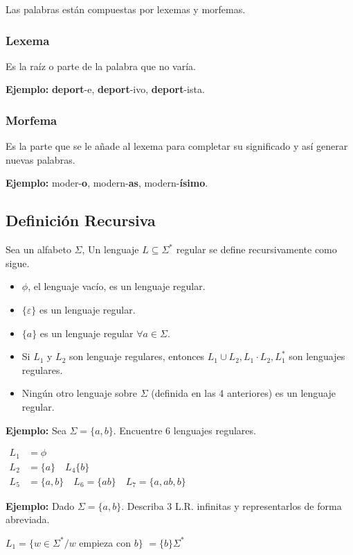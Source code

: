 Las palabras están compuestas por lexemas y morfemas.

\subsubsection{Lexema}
Es la raíz o parte de la palabra que no varía.

\textbf{Ejemplo: }\textbf{deport}-e, \textbf{deport}-ivo, \textbf{deport}-ista.
\subsubsection{Morfema}
Es la parte que se le añade al lexema para completar su significado y así generar nuevas palabras.

\textbf{Ejemplo: }moder-\textbf{o}, modern-\textbf{as}, modern-\textbf{ísimo}.

\subsection{Definición Recursiva}

Sea un alfabeto $\Sigma$, Un lenguaje $L\subseteq \Sigma^*$ regular se define recursivamente como sigue.
\begin{itemize}
\item $\phi$, el lenguaje vacío, es un lenguaje regular.
\item $\{ \varepsilon \}$ es un lenguaje regular.
\item $\{ a \}$ es un lenguaje regular $\forall a\in \Sigma$.
\item Si $L_1$ y $L_2$ son lenguaje regulares, entonces $L_1 \cup L_2, L_1 \cdot L_2 ,L_1^*$ son lenguajes regulares.
\item Ningún otro lenguaje sobre $\Sigma$ (definida en las 4 anteriores) es un lenguaje regular.
\end{itemize}

\textbf{Ejemplo: }Sea $\Sigma =\{ a,b \}$. Encuentre 6 lenguajes regulares.

$\begin{array}{rl}
L_1 &=\phi \\
L_2 &=\{a\} \quad L_4\{b\}\\
L_5 &=\{a,b\} \quad L_6=\{ ab\} \quad L_7=\{ a,ab,b\}
\end{array}$

\textbf{Ejemplo: }Dado $\Sigma = \{ a,b\}$. Describa 3 L.R. infinitas y representarlos de forma abreviada.

$L_1=\{ w\in \Sigma^* / w$ empieza con $b\}$ $=\{b\}\Sigma^*$

